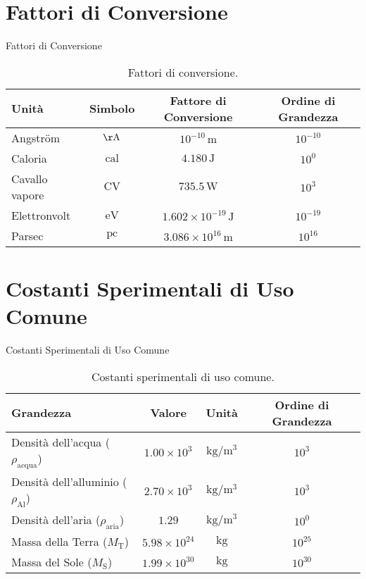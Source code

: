 \documentclass[9pt]{beamer}
\begin{document}
\section{Fattori di Conversione}
\begin{frame}{Fattori di Conversione}
    \begin{table}[h!]
        \centering
        \begin{tabular}{|l|c|c|c|}
            \hline
            \textbf{Unità} & \textbf{Simbolo} & \textbf{Fattore di Conversione} & \textbf{Ordine di Grandezza} \\
            \hline
            Angström & $\mathrm{\AA}$ & $10^{-10} \, \mathrm{m}$ & $10^{-10}$ \\
            Caloria & $\mathrm{cal}$ & $4.180 \, \mathrm{J}$ & $10^{0}$ \\
            Cavallo vapore & $\mathrm{CV}$ & $735.5 \, \mathrm{W}$ & $10^{3}$ \\
            Elettronvolt & $\mathrm{eV}$ & $1.602 \times 10^{-19} \, \mathrm{J}$ & $10^{-19}$ \\
            Parsec & $\mathrm{pc}$ & $3.086 \times 10^{16} \, \mathrm{m}$ & $10^{16}$ \\
            \hline
        \end{tabular}
        \caption{Fattori di conversione.}
    \end{table}
\end{frame}

\section{Costanti Sperimentali di Uso Comune}
\begin{frame}{Costanti Sperimentali di Uso Comune}
    \begin{table}[h!]
        \centering
        \begin{tabular}{|l|c|c|c|}
            \hline
            \textbf{Grandezza} & \textbf{Valore} & \textbf{Unità} & \textbf{Ordine di Grandezza} \\
            \hline
            Densità dell'acqua ($\rho_{\text{acqua}}$) & $1.00 \times 10^{3}$ & $\mathrm{kg/m^3}$ & $10^{3}$ \\
            Densità dell'alluminio ($\rho_{\text{Al}}$) & $2.70 \times 10^{3}$ & $\mathrm{kg/m^3}$ & $10^{3}$ \\
            Densità dell'aria ($\rho_{\text{aria}}$) & $1.29$ & $\mathrm{kg/m^3}$ & $10^{0}$ \\
            Massa della Terra ($M_{\text{T}}$) & $5.98 \times 10^{24}$ & $\mathrm{kg}$ & $10^{25}$ \\
            Massa del Sole ($M_{\text{S}}$) & $1.99 \times 10^{30}$ & $\mathrm{kg}$ & $10^{30}$ \\
            \hline
        \end{tabular}
        \caption{Costanti sperimentali di uso comune.}
    \end{table}
\end{frame}
\end{document}

